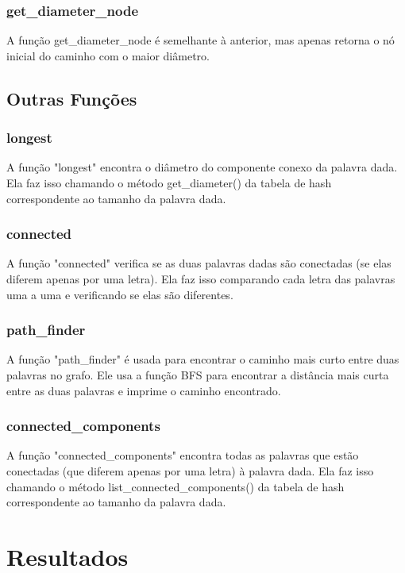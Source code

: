 \documentclass[a4paper,11pt]{article}
\begin{document}
    \subsubsection{get\_diameter\_node}
    A função get\_diameter\_node é semelhante à anterior, mas apenas retorna o nó inicial do caminho com o maior diâmetro.

    \subsection{Outras Funções}\label{subsec:outras-funcoes}

    \subsubsection{longest}
    A função "longest" encontra o diâmetro do componente conexo da palavra dada. Ela faz isso chamando o método get\_diameter() da tabela de hash correspondente ao tamanho da palavra dada.
    
    \subsubsection{connected}
    A função "connected" verifica se as duas palavras dadas são conectadas (se elas diferem apenas por uma letra). Ela faz isso comparando cada letra das palavras uma a uma e verificando se elas são diferentes.
    
    \subsubsection{path\_finder}
    A função "path\_finder" é usada para encontrar o caminho mais curto entre duas palavras no grafo. Ele usa a função BFS para encontrar a distância mais curta entre as duas palavras e imprime o caminho encontrado.
    
    \subsubsection{connected\_components}
A função "connected\_components" encontra todas as palavras que estão conectadas (que diferem apenas por uma letra) à palavra dada. Ela faz isso chamando o método list\_connected\_components() da tabela de hash correspondente ao tamanho da palavra dada.
    
    \section{Resultados}\label{sec:resultados}
\end{document}
